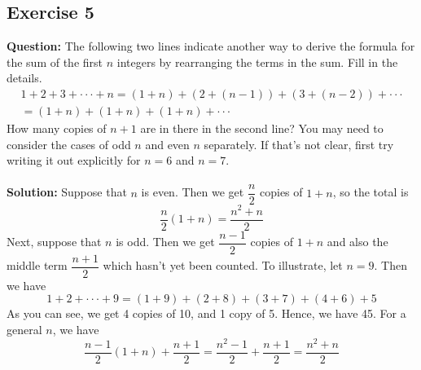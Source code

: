 \documentclass{article}
\begin{document}
\subsection{Exercise 5}
\textbf{Question:} The following two lines indicate another way to derive the formula for the sum of the first $n$ integers by rearranging the terms in the sum. Fill in the details.
\begin{equation*}
\begin{split}
1+2+3+\cdot\cdot\cdot+n = (1+n)+(2+(n-1))+(3+(n-2))+\cdot\cdot\cdot
\\ = (1+n)+(1+n)+(1+n)+\cdot\cdot\cdot
\end{split}
\end{equation*}
How many copies of $n+1$ are in there in the second line? You may need to consider the cases of odd $n$ and even $n$ separately. If that's not clear, first try writing it out explicitly for $n = 6$ and $n = 7$.\\
\\\textbf{Solution:} Suppose that $n$ is even. Then we get $\dfrac{n}{2}$ copies of $1+n$, so the total is
\begin{equation*}
\dfrac{n}{2}(1+n)=\dfrac{n^2+n}{2}
\end{equation*}
Next, suppose that $n$ is odd. Then we get $\dfrac{n-1}{2}$ copies of $1+n$ and also the middle term $\dfrac{n+1}{2}$ which hasn't yet been counted. To illustrate, let $n = 9$. Then we have
\begin{equation*}
1+2+\cdot\cdot\cdot+9 = (1+9)+(2+8)+(3+7)+(4+6)+5
\end{equation*}
As you can see, we get 4 copies of 10, and 1 copy of 5. Hence, we have 45. For a general $n$, we have
\begin{equation*}
\dfrac{n-1}{2}(1+n)+\dfrac{n+1}{2}=\dfrac{n^{2}-1}{2}+\dfrac{n+1}{2}=\dfrac{n^{2}+n}{2}
\end{equation*}
\newpage
\end{document}
